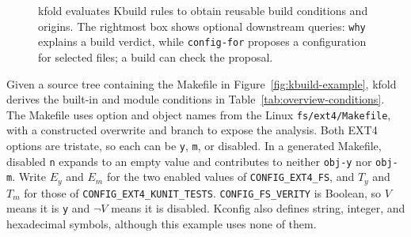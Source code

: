 \documentclass[acmsmall]{acmart}
\newcommand{\tool}{\textsf{kfold}\xspace}
\newcounter{none}
\begin{document}
\begin{figure}[H]
\centering
{}
\caption{\tool evaluates Kbuild rules to obtain reusable build conditions and origins.
The rightmost box shows optional downstream queries: \texttt{why} explains a build verdict, while \texttt{config-for} proposes a configuration for selected files; a build can check the proposal.}
\label{fig:overview-pipeline}
\end{figure}

Given a source tree containing the Makefile in Figure~\ref{fig:kbuild-example}, \tool derives the built-in and module conditions in Table~\ref{tab:overview-conditions}.
The Makefile uses option and object names from the Linux \NLinuxVersion \texttt{fs/ext4/Makefile}, with a constructed overwrite and branch to expose the analysis.
Both EXT4 options are tristate, so each can be \texttt{y}, \texttt{m}, or disabled.
In a generated Makefile, disabled \texttt{n} expands to an empty value and contributes to neither \texttt{obj-y} nor \texttt{obj-m}.
Write $E_y$ and $E_m$ for the two enabled values of \texttt{CONFIG\_EXT4\_FS}, and $T_y$ and $T_m$ for those of \texttt{CONFIG\_EXT4\_KUNIT\_TESTS}.
\texttt{CONFIG\_FS\_VERITY} is Boolean, so $V$ means it is \texttt{y} and $\neg V$ means it is disabled.
Kconfig also defines string, integer, and hexadecimal symbols, although this example uses none of them.
\end{document}

